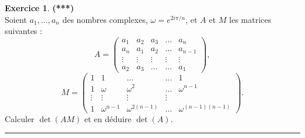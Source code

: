 \documentclass[a4paper,11pt]{article}
\theoremstyle{definition}
\newtheorem{exo}{Exercice} %
\begin{document}
\begin{exo}\textbf{(***)}\quad\\[0.25cm]%
	Soient $a_1,\dots,a_n$ des nombres complexes, $\omega=e^{2i\pi/n}$, et $A$ et $M$ les matrices suivantes :
	$$A=\left(
	\begin{array}{ccccc}
	a_1&a_2&a_3&\dots&a_n\\
	a_n&a_1&a_2&\dots&a_{n-1}\\
	\vdots&\vdots&\vdots&\vdots&\vdots\\
	a_2&a_3&\dots&\dots&a_{1}
	\end{array}\right),$$
	$$M=\left(
	\begin{array}{ccccc}
	1&1&\dots&\dots&1\\
	1&\omega&\omega^2&\dots&\omega^{n-1}\\
	\vdots&\vdots&\vdots&\vdots\\
	1&\omega^{n-1}&\omega^{2(n-1)}&\dots&\omega^{(n-1)(n-1)}
	\end{array}
	\right).$$
	Calculer $\det(AM)$ et en déduire $\det(A)$.
	
	\centering
	\rule{1\linewidth}{0.6pt}
\end{exo}
\end{document}
